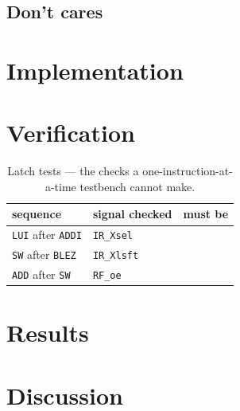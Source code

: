 \subsection*{Don't cares}

\section{Implementation}


\section{Verification}
%

\begin{table}[htbp]
\centering
\caption{Latch tests --- the checks a one-instruction-at-a-time testbench
cannot make.}
\label{tab:lab11-latch}
\begin{tabular}{lll}
\toprule
sequence & signal checked & must be \\
\midrule
\texttt{LUI} after \texttt{ADDI} & \texttt{IR\_Xsel} & \\
\texttt{SW} after \texttt{BLEZ} & \texttt{IR\_Xlsft} & \\
\texttt{ADD} after \texttt{SW} & \texttt{RF\_oe} & \\
\bottomrule
\end{tabular}
\end{table}

\section{Results}



\section{Discussion}
%
